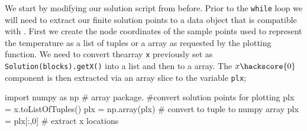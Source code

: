 We start by modifying our solution script from before.
Prior to the \verb|while| loop we will need to extract our finite solution points to a data object that is compatible with \mpl. First we create the node coordinates of the sample points used to represent
the temperature as a \pyt list of tuples or a \numpy array as requested by the plotting function. 
We need to convert thearray \verb|x| previously set as \verb|Solution(blocks).getX()| into a \pyt list 
and then to a \numpy array. The $x\hackscore{0}$ component is then extracted via an array slice to the variable \verb|plx|; 
\begin{python}
import numpy as np # array package.
#convert solution points for plotting
plx = x.toListOfTuples() 
plx = np.array(plx) # convert to tuple to numpy array
plx = plx[:,0] # extract x locations
\end{python}

